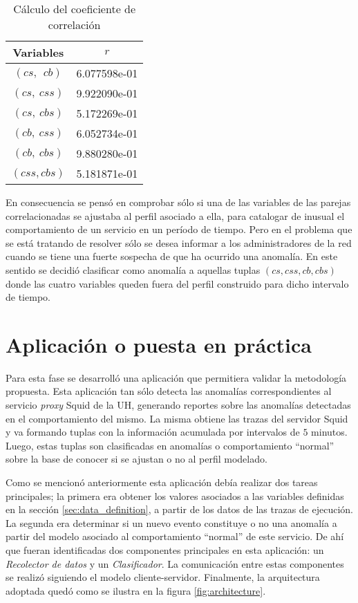 \begin{table}[ht]
 \begin{center}
  \begin{tabular}{|c|c|}
   \hline
    Variables
   & $r$
   \\\hline
   $(cs, \ \ cb)$
   & 6.077598e-01 
   \\\hline
   $( cs, \ css)$  
   & 9.922090e-01
   \\\hline
   $(cs,\  cbs)$
   & 5.172269e-01
   \\\hline
   $(cb,\ css)$
   & 6.052734e-01
   \\\hline
   $(cb,\  cbs)$
   & 9.880280e-01
   \\\hline
   $( css,  cbs)$
   & 5.181871e-01
   \\\hline
  \end{tabular}
 \end{center}
 \caption{Cálculo del coeficiente de correlación}
 \label{tab:correlation}
\end{table}

En consecuencia se pensó en comprobar sólo si una de las variables de las
parejas correlacionadas se ajustaba al perfil asociado a ella, para catalogar de
inusual el comportamiento de un servicio en un período de tiempo. Pero en el
problema que se está tratando de resolver sólo se desea informar a los
administradores de la red cuando se tiene una fuerte sospecha de que ha ocurrido
una anomalía. En este sentido se decidió clasificar como anomalía a aquellas
tuplas $(cs, css, cb, cbs)$ donde las cuatro variables queden fuera del perfil
construido para dicho intervalo de tiempo.

\section{Aplicación o puesta en práctica}
Para esta fase se desarrolló una aplicación\cite{Gonzalez2008} que permitiera
validar la metodología propuesta. Esta aplicación tan sólo detecta las anomalías
correspondientes al servicio \textit{proxy} Squid de la UH, generando reportes
sobre las anomalías detectadas en el comportamiento del mismo. La misma obtiene
las trazas del servidor Squid y va formando tuplas con la información acumulada
por intervalos de $5$ minutos. Luego, estas tuplas son clasificadas en anomalías
o comportamiento ``normal'' sobre la base de conocer si se ajustan o no al
perfil modelado. 

Como se mencionó anteriormente esta aplicación debía realizar dos tareas
principales; la primera era obtener los valores asociados a las variables
definidas en la sección \ref{sec:data_definition}, a partir de los datos de las
trazas de ejecución. La segunda era determinar si un nuevo evento constituye o
no una anomalía a partir del modelo asociado al comportamiento ``normal'' de
este servicio. De ahí que fueran identificadas dos componentes principales en
esta aplicación: un \emph{Recolector de datos} y un \emph{Clasificador}. La
comunicación entre estas componentes se realizó siguiendo el modelo
cliente-servidor. Finalmente, la arquitectura adoptada quedó como se ilustra en
la figura \ref{fig:architecture}.


